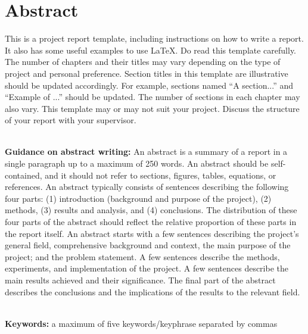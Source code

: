 \chapter*{\center \Large  Abstract}

This is a project report template, including instructions on how to write a report. It also has some useful examples to use \LaTeX. Do read this template carefully. The number of chapters and their titles may vary depending on the type of project and personal preference. Section titles in this template are illustrative should be updated accordingly. For example, sections named ``A section...'' and ``Example of ...'' should be updated. The number of sections in each chapter may also vary. This template may or may not suit your project. Discuss the structure of your report with your supervisor.

~\\[1cm]%
\noindent\textbf{Guidance on abstract writing:} An abstract is a summary of a report in a single paragraph up to a maximum of 250 words. An abstract should be self-contained, and it should not refer to sections, figures, tables, equations, or references. An abstract typically consists of sentences describing the following four parts: (1) introduction (background and purpose of the project), (2) methods, (3) results and analysis, and (4) conclusions. The distribution of these four parts of the abstract should reflect the relative proportion of these parts in the report itself. An abstract starts with a few sentences describing the project's general field, comprehensive background and context, the main purpose of the project; and the problem statement. A few sentences describe the methods, experiments, and implementation of the project. A few sentences describe the main results achieved and their significance. The final part of the abstract describes the conclusions and the implications of the results to the relevant field.


~\\[1cm]
\noindent %
\textbf{Keywords:} a maximum of five keywords/keyphrase separated by commas

